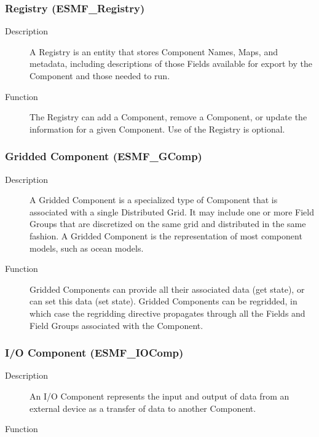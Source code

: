 \subsubsection{Registry (ESMF\_Registry)} 
\label{sec:registry}
\begin{description}
\item [Description]  A Registry is an entity that stores Component Names, Maps, and metadata,
including descriptions of those Fields available for export by the Component and those needed to run.   
\item [Function] The Registry can add a Component, remove a Component, or update the information
for a given Component.  Use of the Registry is optional.
\end{description}

\subsubsection{Gridded Component (ESMF\_GComp)} 
\label{sec:gridcomp}
\begin{description}
\item [Description] A Gridded Component is a specialized type of Component that is associated
with a single Distributed Grid.  It may include one or more Field Groups that are discretized 
on the same grid and distributed in the same fashion.  A Gridded Component is the representation 
of most component models, such as ocean models.  
\item [Function] Gridded Components can provide all their associated data (get state), or can
set this data (set state).  Gridded Components can be regridded, in which case the regridding directive
propagates through all the Fields and Field Groups associated with the Component.  
\end{description}

\subsubsection{I/O Component (ESMF\_IOComp)} 
\begin{description}
\item [Description] An I/O Component represents the input and output of data from an external
device as a transfer of data to another Component.  
\item [Function]
\end{description}

